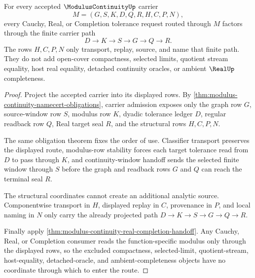 \begin{theorem}
\label{thm:modulus-continuity-cauchy-route}
For every accepted $\ModulusContinuityUp$ carrier
$$
M=(G,S,K,D,Q,R,H,C,P,N),
$$
every Cauchy, Real, or Completion tolerance request routed through $M$ factors through the finite carrier path
$$
D \to K \to S \to G \to Q \to R .
$$
The rows $H,C,P,N$ only transport, replay, source, and name that finite path. They do not add open-cover compactness, selected limits, quotient stream equality, host real equality, detached continuity oracles, or ambient $\RealUp$ completeness.
\end{theorem}
\begin{proof}
Project the accepted carrier into its displayed rows. By \autoref{thm:modulus-continuity-namecert-obligations}, carrier admission exposes only the graph row $G$, source-window row $S$, modulus row $K$, dyadic tolerance ledger $D$, regular readback row $Q$, Real target seal $R$, and the structural rows $H,C,P,N$.

The same obligation theorem fixes the order of use. Classifier transport preserves the displayed route, modulus-row stability forces each target tolerance read from $D$ to pass through $K$, and continuity-window handoff sends the selected finite window through $S$ before the graph and readback rows $G$ and $Q$ can reach the terminal seal $R$.

The structural coordinates cannot create an additional analytic source. Componentwise transport in $H$, displayed replay in $C$, provenance in $P$, and local naming in $N$ only carry the already projected path $D \to K \to S \to G \to Q \to R$.

Finally apply \autoref{thm:modulus-continuity-real-completion-handoff}. Any Cauchy, Real, or Completion consumer reads the function-specific modulus only through the displayed rows, so the excluded compactness, selected-limit, quotient-stream, host-equality, detached-oracle, and ambient-completeness objects have no coordinate through which to enter the route.
\end{proof}

